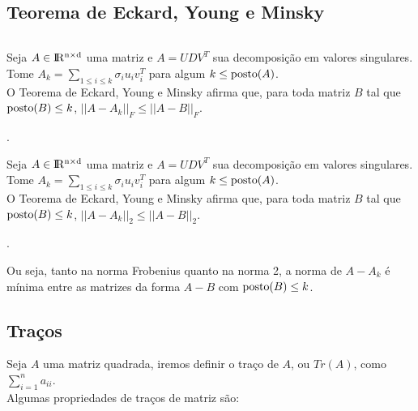 \subsection{Teorema de Eckard, Young e Minsky}
\[\]

\begin{teorema}
Seja $ A \in {\rm I\!R^{n\times d}}$ uma matriz e $A = UDV^T$ sua decomposição em valores singulares.\\

Tome $A_k = \sum_{1\leq i \leq k} \sigma_i u_i v_i^T $ para algum $k\leq \operatorname{posto}(A)$.\\

O Teorema de Eckard, Young e Minsky afirma que, para toda matriz $B$ tal que $\operatorname{posto}(B) \leq k$, $ ||A-A_k||_F \leq ||A-B||_F $.
\end{teorema}.

\begin{teorema}
Seja $ A \in {\rm I\!R^{n\times d}}$ uma matriz e $A = UDV^T$ sua decomposição em valores singulares.\\

Tome $A_k = \sum_{1\leq i \leq k} \sigma_i u_i v_i^T $ para algum $k\leq \operatorname{posto}(A)$.\\

O Teorema de Eckard, Young e Minsky afirma que, para toda matriz $B$ tal que $\operatorname{posto}(B) \leq k$, $ ||A-A_k||_2 \leq ||A-B||_2 $.
\end{teorema}.


Ou seja, tanto na norma Frobenius quanto na norma 2, a norma de $A-A_k$ é mínima entre as matrizes da forma $A-B$ com $\operatorname{posto}(B) \leq k$.

\subsection{Traços}

Seja $A$ uma matriz quadrada, iremos definir o traço de $A$, ou $Tr(A)$, como $\sum_{i=1}^n a_{ii}$.
\[\]
Algumas propriedades de traços de matriz são:

